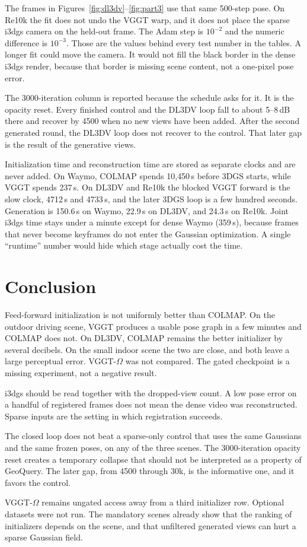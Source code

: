 \documentclass[10pt,twocolumn,letterpaper]{article}
\begin{document}
The frames in Figures~\ref{fig:dl3dv}--\ref{fig:part3} use that same 500-step pose.
On Re10k the fit does not undo the VGGT warp, and it does not place the sparse i3dgs camera on the held-out frame.
The Adam step is $10^{-2}$ and the numeric difference is $10^{-3}$.
Those are the values behind every test number in the tables.
A longer fit could move the camera.
It would not fill the black border in the dense i3dgs render, because that border is missing scene content, not a one-pixel pose error.

The 3000-iteration column is reported because the schedule asks for it.
It is the opacity reset.
Every finished control and the DL3DV loop fall to about 5--8\,dB there and recover by 4500 when no new views have been added.
After the second generated round, the DL3DV loop does not recover to the control.
That later gap is the result of the generative views.

Initialization time and reconstruction time are stored as separate clocks and are never added.
On Waymo, COLMAP spends 10{,}450\,s before 3DGS starts, while VGGT spends 237\,s.
On DL3DV and Re10k the blocked VGGT forward is the slow clock, 4712\,s and 4733\,s, and the later 3DGS loop is a few hundred seconds.
Generation is 150.6\,s on Waymo, 22.9\,s on DL3DV, and 24.3\,s on Re10k.
Joint i3dgs time stays under a minute except for dense Waymo (359\,s), because frames that never become keyframes do not enter the Gaussian optimization.
A single ``runtime'' number would hide which stage actually cost the time.

\section{Conclusion}
Feed-forward initialization is not uniformly better than COLMAP.
On the outdoor driving scene, VGGT produces a usable pose graph in a few minutes and COLMAP does not.
On DL3DV, COLMAP remains the better initializer by several decibels.
On the small indoor scene the two are close, and both leave a large perceptual error.
VGGT-$\Omega$ was not compared.
The gated checkpoint is a missing experiment, not a negative result.

i3dgs should be read together with the dropped-view count.
A low pose error on a handful of registered frames does not mean the dense video was reconstructed.
Sparse inputs are the setting in which registration succeeds.

The closed loop does not beat a sparse-only control that uses the same Gaussians and the same frozen poses, on any of the three scenes.
The 3000-iteration opacity reset creates a temporary collapse that should not be interpreted as a property of GeoQuery.
The later gap, from 4500 through 30k, is the informative one, and it favors the control.

VGGT-$\Omega$ remains ungated access away from a third initializer row.
Optional datasets were not run.
The mandatory scenes already show that the ranking of initializers depends on the scene, and that unfiltered generated views can hurt a sparse Gaussian field.

{\small


}
\end{document}

